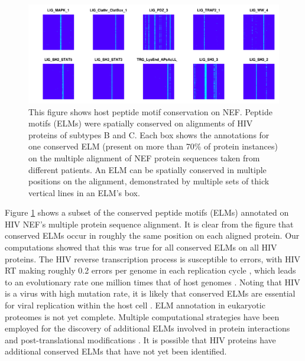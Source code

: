 \begin{figure}
\begin{center}
\includegraphics[scale=.5]{figs/medGen_1}
\end{center}
\caption[Host peptide motif conservation on HIV NEF]{\small This
  figure shows host peptide motif conservation on NEF. Peptide motifs
  (ELMs) were spatially conserved on alignments of HIV proteins of
  subtypes B and C. Each box shows the annotations for one conserved
  ELM (present on more than 70\% of protein instances) on the multiple
  alignment of NEF protein sequences taken from different patients. An
  ELM can be spatially conserved in multiple positions on the
  alignment, demonstrated by multiple sets of thick vertical lines in
  an ELM's box. \label{fig:medGen:fig1}}
\end{figure}

Figure \ref{fig:medGen:fig1} shows a subset of the conserved peptide
motifs (ELMs) annotated on HIV NEF's multiple protein sequence
alignment. It is clear from the figure that conserved ELMs occur in
roughly the same position on each aligned protein. Our computations
showed that this was true for all conserved ELMs on all HIV
proteins. The HIV reverse transcription process is susceptible to
errors, with HIV RT making roughly 0.2 errors per genome in each
replication cycle \cite{rambaut2004causes}, which leads to an
evolutionary rate one million times that of host genomes
\cite{mansky1998retrovirus}. Noting that HIV is a virus with high
mutation rate, it is likely that conserved ELMs are essential for
viral replication within the host cell \cite{kadaveru08}. ELM
annotation in eukaryotic proteomes is not yet complete. Multiple
computational strategies have been employed for the discovery of
additional ELMs involved in protein interactions and
post-translational modifications \cite{neduva06biotech,dinkel07}. It
is possible that HIV proteins have additional conserved ELMs that have
not yet been identified.

